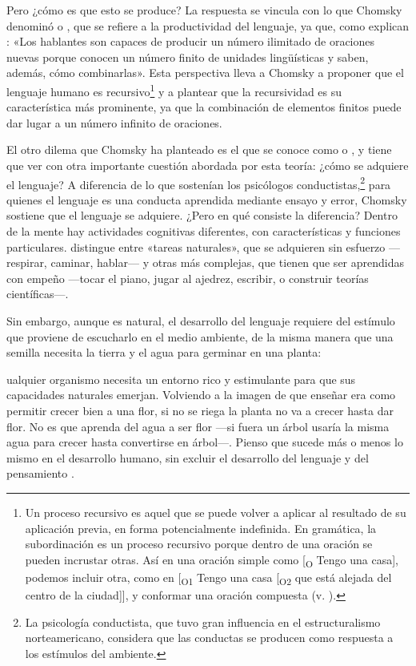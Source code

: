 Pero ¿cómo es que esto se produce? La respuesta se vincula con lo que Chomsky
denominó  o , que se refiere a la productividad del lenguaje, ya que, como
explican \textcite[17]{eguren2004}: «Los hablantes son capaces de producir un
número ilimitado de oraciones nuevas porque conocen un número finito de
unidades lingüísticas y saben, además, cómo combinarlas». Esta perspectiva
lleva a Chomsky a proponer que el lenguaje humano es recursivo\footnote{Un
proceso recursivo es aquel que se puede volver a aplicar al resultado de su
aplicación previa, en forma potencialmente indefinida. En gramática, la
subordinación es un proceso recursivo porque dentro de una oración se pueden
incrustar otras. Así en una oración simple como [\textsubscript{O} Tengo una
casa], podemos incluir otra, como en [\textsubscript{O1} Tengo una casa
[\textsubscript{O2} que está alejada del centro de la ciudad]], y conformar
una oración compuesta (v. ).} y a plantear que la recursividad es
su característica más prominente, ya que la combinación de elementos finitos
puede dar lugar a un número infinito de oraciones.

El otro dilema que Chomsky ha planteado es el que se conoce como  o , y tiene que ver
con otra importante cuestión abordada por esta teoría: ¿cómo se adquiere el
lenguaje? A diferencia de lo que sostenían los psicólogos
conductistas,\footnote{La psicología conductista, que tuvo gran influencia en
el estructuralismo norteamericano, considera que las conductas se producen
como respuesta a los estímulos del ambiente.} para quienes el lenguaje es una
conducta aprendida mediante ensayo y error, Chomsky sostiene que el lenguaje se
adquiere. ¿Pero en qué consiste la diferencia? Dentro de la mente hay
actividades cognitivas diferentes, con características y funciones
particulares. \textcite{chomsky1993} distingue entre «tareas naturales», que se
adquieren sin esfuerzo ---respirar, caminar, hablar--- y otras más complejas,
que tienen que ser aprendidas con empeño ---tocar el piano, jugar al ajedrez,
escribir, o construir teorías científicas---.

Sin embargo, aunque es natural, el desarrollo del lenguaje requiere del
estímulo que proviene de escucharlo en el medio ambiente, de la misma manera
que una semilla necesita la tierra y el agua para germinar en una planta:

\begin{cita}
[C]ualquier organismo necesita un entorno rico y estimulante para que sus
capacidades naturales emerjan. Volviendo a la imagen de que enseñar era como
permitir crecer bien a una flor, si no se riega la planta no va a crecer hasta
dar flor. No es que aprenda del agua a ser flor ---si fuera un árbol usaría la
misma agua para crecer hasta convertirse en árbol---. Pienso que sucede más o
menos lo mismo en el desarrollo humano, sin excluir el desarrollo del lenguaje
y del pensamiento \parencite[160]{chomsky1992}.
\end{cita}


